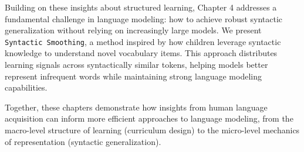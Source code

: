 Building on these insights about structured learning, Chapter 4 addresses a fundamental challenge in language modeling: how to achieve robust syntactic generalization without relying on increasingly large models. We present \texttt{Syntactic Smoothing}, a method inspired by how children leverage syntactic knowledge to understand novel vocabulary items. This approach distributes learning signals across syntactically similar tokens, helping models better represent infrequent words while maintaining strong language modeling capabilities.

Together, these chapters demonstrate how insights from human language acquisition can inform more efficient approaches to language modeling, from the macro-level structure of learning (curriculum design) to the micro-level mechanics of representation (syntactic generalization).